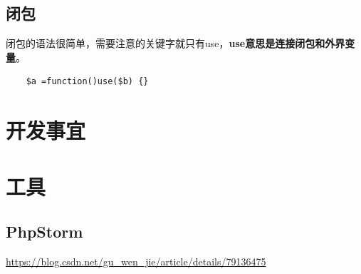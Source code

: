 \documentclass[UTF8,a4paper,12pt]{ctexbook}
\begin{document}
	
	\section{闭包}
		闭包的语法很简单，需要注意的关键字就只有use，\textbf{use意思是连接闭包和外界变量}。
		\begin{lstlisting}
	$a =function()use($b) {}
		\end{lstlisting}
		
		
\chapter{开发事宜}
 
 
 
 
\chapter{工具}
	\section{PhpStorm}
		\url{https://blog.csdn.net/gu_wen_jie/article/details/79136475}
	
 		  			
\end{document}
